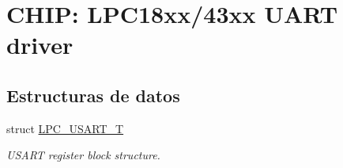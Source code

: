 \hypertarget{group___u_a_r_t__18_x_x__43_x_x}{}\section{C\+H\+IP\+: L\+P\+C18xx/43xx U\+A\+RT driver}
\label{group___u_a_r_t__18_x_x__43_x_x}
\subsection*{Estructuras de datos}
\begin{DoxyCompactItemize}
\item 
struct \hyperlink{struct_l_p_c___u_s_a_r_t___t}{L\+P\+C\+\_\+\+U\+S\+A\+R\+T\+\_\+T}
\begin{DoxyCompactList}\small\item\em U\+S\+A\+RT register block structure. \end{DoxyCompactList}\end{DoxyCompactItemize}
